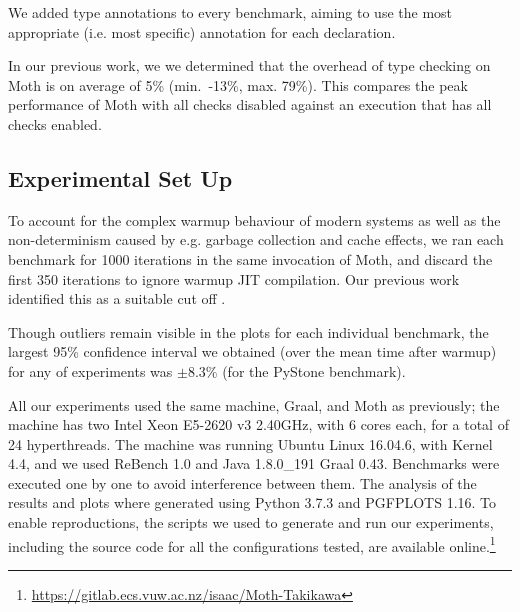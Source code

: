 \documentclass[sigplan,screen]{acmart}
\newcommand{\ie}{i.e.\xspace}
\newcommand{\eg}{e.g.\xspace}
\begin{document}

We added type annotations to every benchmark, aiming to use the most appropriate (\ie most specific) annotation for each declaration.

In our previous work, we \cite{roberts-and-co-ecoop-2019}
we determined that the overhead of type checking on Moth is on average
of 5\% (min.\ -13\%, max. 79\%).
This compares the peak performance of Moth with all
checks disabled against an execution that has all checks enabled. 
%

\subsection{Experimental Set Up}
To account for the complex warmup behaviour of modern systems \citep{Barrett:2017:VMW} as well as
the non-determinism caused by \eg garbage collection and cache effects, we ran each benchmark for 1000 iterations in the same invocation of Moth, and discard the first 350 iterations to ignore warmup JIT compilation. Our previous work  identified this as a suitable cut off \cite{roberts-and-co-ecoop-2019}.

Though outliers remain visible in the plots for each individual benchmark, the largest 95\% confidence interval we obtained (over the mean time after warmup) for any of experiments was $\pm8.3\%$ (for the PyStone benchmark).

All our experiments used the same machine, Graal, and Moth as previously; the machine has two Intel Xeon E5-2620 v3 2.40GHz, with 6 cores each, for a total of 24 hyperthreads.
The machine was running Ubuntu Linux 16.04.6, with Kernel 4.4, and we used ReBench 1.0 \citep{ReBench:2018} and Java 1.8.0\_191 Graal 0.43. Benchmarks were executed one by one to avoid interference between them. The analysis of the results and plots where generated using Python 3.7.3 and PGFPLOTS 1.16. To enable reproductions, the scripts we used to generate and run our experiments, including the source code for all the configurations tested, are available online.\footnote{\url{https://gitlab.ecs.vuw.ac.nz/isaac/Moth-Takikawa}}
\end{document}
